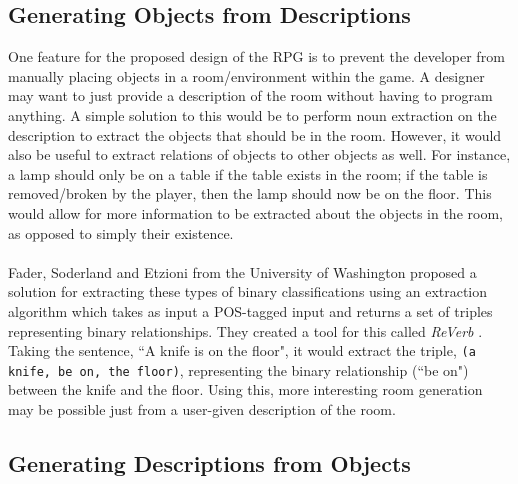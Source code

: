 \documentclass[11pt]{article}
\begin{document}
\subsection{Generating Objects from Descriptions}

One feature for the proposed design of the RPG is to prevent the developer from manually placing objects in a room/environment within the game. A designer may want to just provide a description of the room without having to program anything. A simple solution to this would be to perform noun extraction on the description to extract the objects that should be in the room. However, it would also be useful to extract relations of objects to other objects as well. For instance, a lamp should only be on a table if the table exists in the room; if the table is removed/broken by the player, then the lamp should now be on the floor. This would allow for more information to be extracted about the objects in the room, as opposed to simply their existence.
\\
\\
Fader, Soderland and Etzioni from the University of Washington proposed a solution for extracting these types of binary classifications using an extraction algorithm which takes as input a POS-tagged input and returns a set of triples representing binary relationships. They created a tool for this called \textit{ReVerb} \cite{ReVerb2011}. Taking the sentence, ``A knife is on the floor", it would extract the triple, \texttt{(a knife, be on, the floor)}, representing the binary relationship (``be on") between the knife and the floor. Using this, more interesting room generation may be possible just from a user-given description of the room.

\subsection{Generating Descriptions from Objects}
\end{document}
